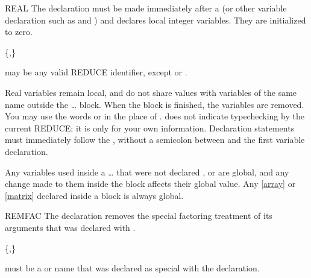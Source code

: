\begin{Declaration}{REAL}
The  declaration must be made immediately after a
 (or other variable declaration such as 
and ) and declares local integer variables.  They are
initialized to zero.
\begin{Syntax}
 \{,\}\optional
\end{Syntax}

 may be any valid REDUCE identifier, except
 or .

\begin{Comments}
Real variables remain local, and do not share values with variables of the
same name outside the \ldots{} block.  When the
block is finished, the variables are removed.  You may use the words
 or  in the place of .
 does not indicate typechecking by the current REDUCE; it is
only for your own information.  Declaration statements must immediately
follow the , without a semicolon between  and the
first variable declaration.

Any variables used inside a \ldots{} 
that were not declared ,  or  are
global, and any change made to them inside the block affects their global
value.  Any \ref{array} or \ref{matrix} declared inside a block is always
global.
\end{Comments}
\end{Declaration}


\begin{Declaration}{REMFAC}
The  declaration removes the special factoring treatment of its
arguments that was declared with .
\begin{Syntax}
 \{,\}\repeated
\end{Syntax}

 must be a  or  name that
was declared as special with the  declaration.
\end{Declaration}


